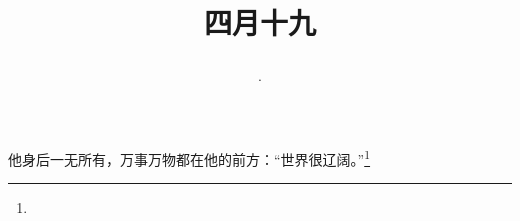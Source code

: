 \title{\date[d=26,m=5,y=2024][year:cn-y,年,month:cn,day:cn,日,·,weekday]·四月十九 }
他身后一无所有，万事万物都在他的前方：“世界很辽阔。”\footnote{ }

